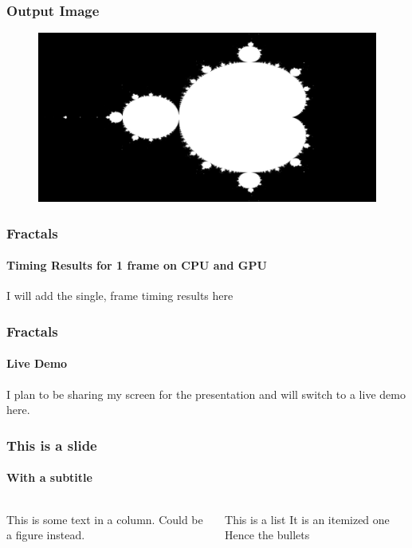 \documentclass[aspectratio=169]{beamer}
\begin{document}
\begin{frame}
	\frametitle{Output Image}
    \begin{figure}[H]
        \centering
        \includegraphics[width=\textwidth]{./figures/mandelbrot.png}
    \end{figure}
\end{frame}

\begin{frame}
	\frametitle{Fractals}
	\framesubtitle{Timing Results for 1 frame on CPU and GPU}

	I will add the single, frame timing results here
\end{frame}

\begin{frame}
	\frametitle{Fractals}
	\framesubtitle{Live Demo}

	I plan to be sharing my screen for the presentation and will switch to a live demo here.
\end{frame}

\begin{frame}
	\frametitle{This is a slide}
	\framesubtitle{With a subtitle}

	\begin{columns}
		\begin{column}{0.6\textwidth}
			This is some text in a column. Could be a figure instead.
		\end{column}
		\begin{column}{0.4\textwidth}
			\begin{outline}[itemize]
				\1
				This is a list
				\1
				It is an itemized one
				\1
				Hence the bullets
			\end{outline}
		\end{column}
	\end{columns}
\end{frame}

%     


\end{document}

